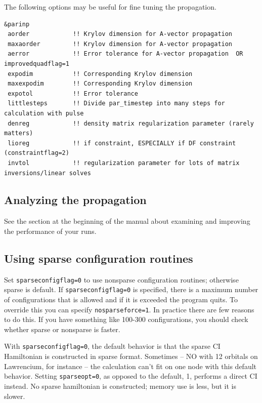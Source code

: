 \documentclass[10pt,leqno, oneside]{book}
\begin{document}
The following options
may be useful for fine tuning the propagation.

{\footnotesize
\begin{verbatim} 
&parinp
 aorder            !! Krylov dimension for A-vector propagation
 maxaorder         !! Krylov dimension for A-vector propagation
 aerror            !! Error tolerance for A-vector propagation  OR  improvedquadflag=1
 expodim           !! Corresponding Krylov dimension 
 maxexpodim        !! Corresponding Krylov dimension 
 expotol           !! Error tolerance
 littlesteps       !! Divide par_timestep into many steps for calculation with pulse
 denreg            !! density matrix regularization parameter (rarely matters)
 lioreg            !! if constraint, ESPECIALLY if DF constraint (constraintflag=2) 
 invtol            !! regularization parameter for lots of matrix inversions/linear solves
\end{verbatim}}

\subsection{Analyzing the propagation}

See the section at the beginning of the manual about examining and improving the performance of your runs.

\subsection{Using sparse configuration routines}

Set \verb#sparseconfigflag=0# to use nonsparse configuration routines; otherwise sparse is default.  
If \verb#sparseconfigflag=0# is specified, there is a maximum number of configurations that is allowed and if it is exceeded
the program quits.
To override this you can specify \verb#nosparseforce=1#.  In practice there are few reasons to do this.  If you have
something like 100-300 configurations, you should check whether sparse or nonsparse is faster.

With \verb#sparseconfigflag=0#, the default behavior is that the sparse CI Hamiltonian is constructed in sparse format.
Sometimes -- NO with 12 orbitals on Lawrencium, for instance -- the calculation can't fit on one node with this default behavior.
Setting \verb#sparseopt=0#, as opposed to the default, 1, performs a direct CI instead.  No sparse hamiltonian is constructed;
memory use is less, but it is slower.
\end{document}
